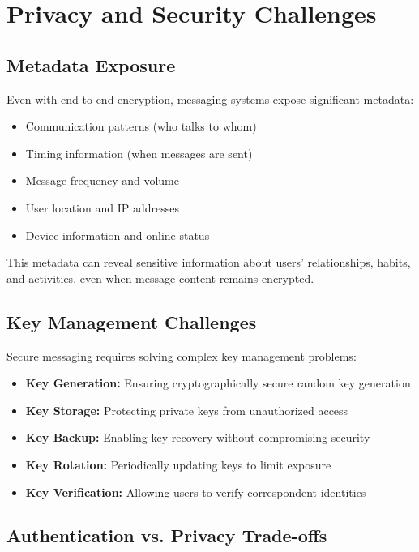 \section{Privacy and Security Challenges}

\subsection{Metadata Exposure}

Even with end-to-end encryption, messaging systems expose significant metadata:
\begin{itemize}
    \item Communication patterns (who talks to whom)
    \item Timing information (when messages are sent)
    \item Message frequency and volume
    \item User location and IP addresses
    \item Device information and online status
\end{itemize}

This metadata can reveal sensitive information about users' relationships, habits, and activities, even when message content remains encrypted.

\subsection{Key Management Challenges}

Secure messaging requires solving complex key management problems:
\begin{itemize}
    \item \textbf{Key Generation:} Ensuring cryptographically secure random key generation
    \item \textbf{Key Storage:} Protecting private keys from unauthorized access
    \item \textbf{Key Backup:} Enabling key recovery without compromising security
    \item \textbf{Key Rotation:} Periodically updating keys to limit exposure
    \item \textbf{Key Verification:} Allowing users to verify correspondent identities
\end{itemize}

\subsection{Authentication vs. Privacy Trade-offs}

